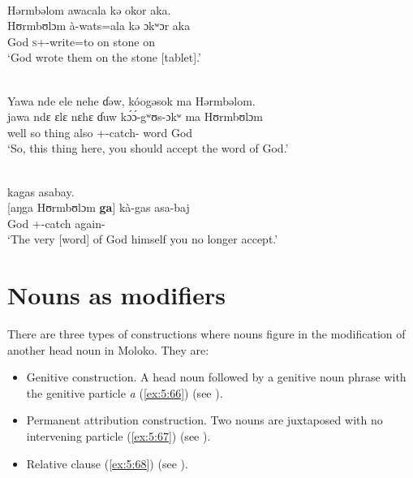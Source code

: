 \clearpage
\ea \label{ex:5:63}\\
Hərmbəlom  awacala  kə  okor  aka.\\
\gll  Hʊrmbʊlɔm à-wats=ala   kə   ɔkʷɔr   aka\\
      God    \textsc{s}+{\PFV}-write=to  on  stone  on\\
\glt  ‘God wrote them on the stone [tablet].’
\z

\ea \label{ex:5:64}\\
Yawa  nde  ele  nehe  ɗəw,  kóogəsok ma  Hərmbəlom.\\
\gll  jawa   ndɛ   ɛlɛ   nɛhɛ   ɗuw  k\'{ɔ}\'{ɔ}-gʷʊs-ɔkʷ     ma   Hʊrmbʊlɔm\\
       well    so  thing  {\DEM}  also  {\twoS}+{\POT}-catch-{\twoP}    word  God\\
\glt  ‘So, this thing here, you should accept the word of God.’ 
\z

\ea \label{ex:5:65}\\  kagas  asabay.\\
\gll  {}[aŋga   Hʊrmbʊlɔm   \textbf{ga}]     kà-gas     asa-baj\\
      {\POSS}  God    {\ADJ}    {\twoS}+{\PFV}-catch  again-{\NEG}\\
\glt  ‘The very [word] of God himself you no longer accept.’ 
\z

\section{Nouns as modifiers}\label{sec:5.4}
\hypertarget{RefHeading1211721525720847}{}
There are three types of constructions where nouns figure in the modification of another head noun in Moloko. They are:

\begin{itemize}
\item Genitive construction. A head noun followed by a genitive noun phrase with the genitive particle \textit{a} (\ref{ex:5:66}) (see ).
\item Permanent attribution construction. Two nouns are juxtaposed with no intervening particle (\ref{ex:5:67}) (see ).
\item Relative clause (\ref{ex:5:68}) (see ). 
\end{itemize}

